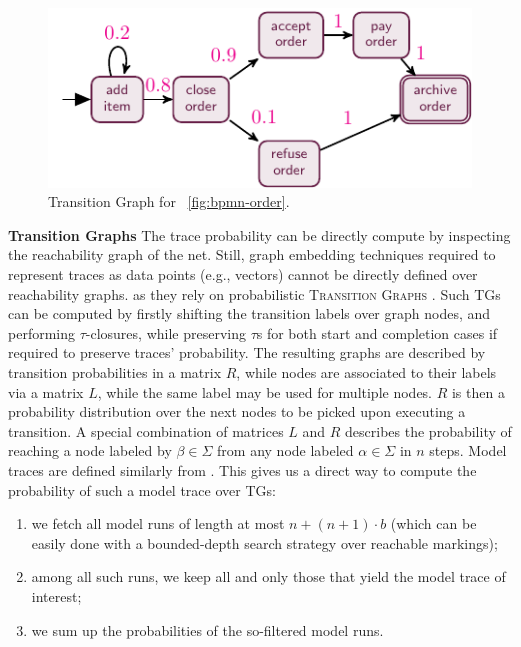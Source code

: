 \begin{figure}[!t]
	\centering
	\includegraphics[width=.4\textwidth]{images/besser_rg}
	\caption{Transition Graph for \figurename~\ref{fig:bpmn-order}.}
\end{figure}
\medskip
\noindent
\textbf{Transition Graphs} The trace probability can be directly compute by inspecting the reachability graph of the net. Still, graph embedding techniques required to represent traces as data points (e.g., vectors) 
cannot be directly defined over reachability graphs. as they %
rely on probabilistic \textsc{Transition Graphs} \cite{GartnerFW03}.  Such TGs can be computed by firstly shifting the transition labels over graph nodes, and performing $\tau$-closures, while preserving $\tau$s for both start and completion cases if required to preserve traces' probability. The resulting  graphs are described by transition probabilities in a matrix $R$, while nodes are associated to their labels via a matrix $L$, while the same label may be used for multiple nodes. $R$ is then a probability distribution over the next nodes to be picked upon executing a transition.
A special combination of matrices $L$ and $R$ \cite{GartnerFW03} describes the probability of reaching a node labeled by $\beta\in\Sigma$ from any node labeled $\alpha\in\Sigma$ in $n$ steps. Model traces  are defined similarly from . This gives us a direct way to compute the probability of such a model trace over TGs:
\begin{enumerate}
	\item  we fetch all model runs of length at most $n+(n+1)\cdot b$ (which can be easily done with a bounded-depth search strategy over reachable markings);
	\item among all such runs, we keep all and only those that yield the model trace of interest;
	\item we sum up the probabilities of the so-filtered model runs.
\end{enumerate}



